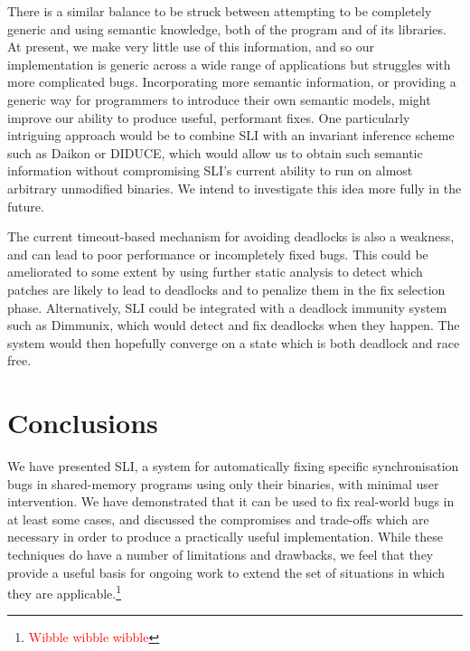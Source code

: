 \documentclass[10pt,twocolumn,preprint,natbib,authoryear]{sigplanconf}
\newcommand{\editorial}[1]{\textcolor{red}{\footnote{\textcolor{red}{#1}}}}
\begin{document}
There is a similar balance to be struck between attempting to be
completely generic and using semantic knowledge, both of the program
and of its libraries.  At present, we make very little use of this
information, and so our implementation is generic across a wide range
of applications but struggles with more complicated bugs.
Incorporating more semantic information, or providing a generic way
for programmers to introduce their own semantic models, might improve
our ability to produce useful, performant fixes.  One particularly
intriguing approach would be to combine SLI with an invariant
inference scheme such as Daikon\cite{Ernst2007} or
DIDUCE\cite{Hangal2002}, which would allow us to obtain such semantic
information without compromising SLI's current ability to run on
almost arbitrary unmodified binaries.  We intend to investigate this
idea more fully in the future.

The current timeout-based mechanism for avoiding deadlocks is also a
weakness, and can lead to poor performance or incompletely fixed bugs.
This could be ameliorated to some extent by using further static
analysis to detect which patches are likely to lead to deadlocks and
to penalize them in the fix selection phase.  Alternatively, SLI could
be integrated with a deadlock immunity system such as
Dimmunix\cite{Jula2008}, which would detect and fix deadlocks when
they happen.  The system would then hopefully converge on a state
which is both deadlock and race free.

\section{Conclusions}

We have presented SLI, a system for automatically fixing specific
synchronisation bugs in shared-memory programs using only their
binaries, with minimal user intervention.  We have demonstrated that
it can be used to fix real-world bugs in at least some cases, and
discussed the compromises and trade-offs which are necessary in order
to produce a practically useful implementation.  While these
techniques do have a number of limitations and drawbacks, we feel that
they provide a useful basis for ongoing work to extend the set of
situations in which they are applicable.\editorial{Wibble wibble
  wibble}




\end{document}

